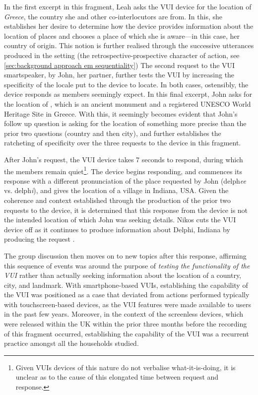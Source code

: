 \begin{revisedsubmission}
In the first excerpt in this fragment, Leah asks the \ac{VUI} device for the location of \textit{Greece}, the country she and other co-interlocutors are from.
In this, she establishes her desire to determine how the device provides information about the location of places and chooses a place of which she is aware---in this case, her country of origin.
This notion is further realised through the successive utterances produced in the setting (the retrospective-prospective character of action, see \ref{sec:background approach em sequentiality})
The second request to the \ac{VUI} smartspeaker, by John, her partner, further tests the \ac{VUI} by increasing the specificity of the locale put to the device to locate.
In both cases, ostensibly, the device responds as members seemingly expect.
In this final excerpt, John asks for the location of , which is an ancient monument and a registered UNESCO World Heritage Site in Greece.
With this, it seemingly becomes evident that John's follow up question is asking for the location of something more precise than the prior two questions (country and then city), and further establishes the ratcheting of specificity over the three requests to the device in this fragment.

After John's request, the \ac{VUI} device takes 7 seconds to respond, during which the members remain quiet\footnote{Given \acp{VUI} devices of this nature do not verbalise what-it-is-doing, it is unclear as to the cause of this elongated time between request and response.}.
The device begins responding, and commences its response with a different pronunciation of the place requested by John (delph\textit{ee} vs. delph\textit{i}), and gives the location of a village in Indiana, USA.
Given the coherence and context established through the production of the prior two requests to the device, it is determined that this response from the device is not the intended location of which John was seeking details.
Nikos cuts the \ac{VUI} device off as it continues to produce information about Delphi, Indiana by producing the request .%

The group discussion then moves on to new topics after this response, affirming this sequence of events was around the purpose of \textit{testing the functionality of the \ac{VUI}} rather than actually seeking information about the location of a country, city, and landmark.
With smartphone-based \acp{VUI}, establishing the capability of the \ac{VUI} was positioned as a case that deviated from actions performed typically with touchscreen-based devices, as the \ac{VUI} features were made available to users in the past few years.
Moreover, in the context of the screenless devices, which were released within the UK within the prior three months before the recording of this fragment occurred, establishing the capability of the \ac{VUI} was a recurrent practice amongst all the households studied.
\end{revisedsubmission}



